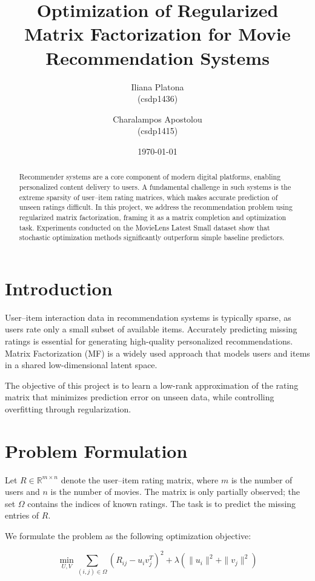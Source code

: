 \documentclass[10pt,twocolumn]{article}
\title{Optimization of Regularized Matrix Factorization for Movie Recommendation Systems}
\author{Iliana Platona\\(csdp1436)\and Charalampos Apostolou\\(csdp1415)}
\date{\today}
\begin{document}
\maketitle

\begin{abstract}
Recommender systems are a core component of modern digital platforms, enabling personalized content delivery to users. A fundamental challenge in such systems is the extreme sparsity of user--item rating matrices, which makes accurate prediction of unseen ratings difficult. In this project, we address the recommendation problem using regularized matrix factorization, framing it as a matrix completion and optimization task. Experiments conducted on the MovieLens Latest Small dataset show that stochastic optimization methods significantly outperform simple baseline predictors.
\end{abstract}

\section{Introduction}
User--item interaction data in recommendation systems is typically sparse, as users rate only a small subset of available items. Accurately predicting missing ratings is essential for generating high-quality personalized recommendations. Matrix Factorization (MF) is a widely used approach that models users and items in a shared low-dimensional latent space.

The objective of this project is to learn a low-rank approximation of the rating matrix that minimizes prediction error on unseen data, while controlling overfitting through regularization.

\section{Problem Formulation}
Let $R \in \mathbb{R}^{m \times n}$ denote the user--item rating matrix, where $m$ is the number of users and $n$ is the number of movies. The matrix is only partially observed; the set $\Omega$ contains the indices of known ratings. The task is to predict the missing entries of $R$.

We formulate the problem as the following optimization objective:

\begin{equation}
\min_{U,V} \sum_{(i,j) \in \Omega} (R_{ij} - u_i v_j^T)^2 + \lambda (\|u_i\|^2 + \|v_j\|^2)
\end{equation}
\end{document}
